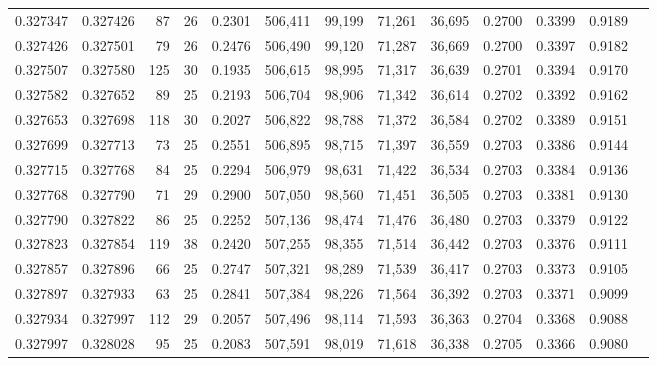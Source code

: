 \begin{tabular}{rrrrrrrrrrrrr}
0.327347 & 0.327426 &    87 &  26 &                                     0.2301 & 506,411 &  99,199 &  71,261 &  36,695 & 0.2700 & 0.3399 & 0.9189 \\
0.327426 & 0.327501 &    79 &  26 &                                     0.2476 & 506,490 &  99,120 &  71,287 &  36,669 & 0.2700 & 0.3397 & 0.9182 \\
0.327507 & 0.327580 &   125 &  30 &                                     0.1935 & 506,615 &  98,995 &  71,317 &  36,639 & 0.2701 & 0.3394 & 0.9170 \\
0.327582 & 0.327652 &    89 &  25 &                                     0.2193 & 506,704 &  98,906 &  71,342 &  36,614 & 0.2702 & 0.3392 & 0.9162 \\
0.327653 & 0.327698 &   118 &  30 &                                     0.2027 & 506,822 &  98,788 &  71,372 &  36,584 & 0.2702 & 0.3389 & 0.9151 \\
0.327699 & 0.327713 &    73 &  25 &                                     0.2551 & 506,895 &  98,715 &  71,397 &  36,559 & 0.2703 & 0.3386 & 0.9144 \\
0.327715 & 0.327768 &    84 &  25 &                                     0.2294 & 506,979 &  98,631 &  71,422 &  36,534 & 0.2703 & 0.3384 & 0.9136 \\
0.327768 & 0.327790 &    71 &  29 &                                     0.2900 & 507,050 &  98,560 &  71,451 &  36,505 & 0.2703 & 0.3381 & 0.9130 \\
0.327790 & 0.327822 &    86 &  25 &                                     0.2252 & 507,136 &  98,474 &  71,476 &  36,480 & 0.2703 & 0.3379 & 0.9122 \\
0.327823 & 0.327854 &   119 &  38 &                                     0.2420 & 507,255 &  98,355 &  71,514 &  36,442 & 0.2703 & 0.3376 & 0.9111 \\
0.327857 & 0.327896 &    66 &  25 &                                     0.2747 & 507,321 &  98,289 &  71,539 &  36,417 & 0.2703 & 0.3373 & 0.9105 \\
0.327897 & 0.327933 &    63 &  25 &                                     0.2841 & 507,384 &  98,226 &  71,564 &  36,392 & 0.2703 & 0.3371 & 0.9099 \\
0.327934 & 0.327997 &   112 &  29 &                                     0.2057 & 507,496 &  98,114 &  71,593 &  36,363 & 0.2704 & 0.3368 & 0.9088 \\
0.327997 & 0.328028 &    95 &  25 &                                     0.2083 & 507,591 &  98,019 &  71,618 &  36,338 & 0.2705 & 0.3366 & 0.9080 \\

\end{tabular}

